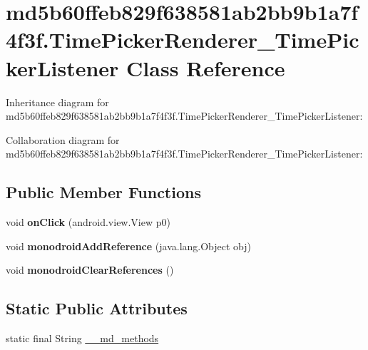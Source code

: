\hypertarget{classmd5b60ffeb829f638581ab2bb9b1a7f4f3f_1_1_time_picker_renderer___time_picker_listener}{}\section{md5b60ffeb829f638581ab2bb9b1a7f4f3f.\+Time\+Picker\+Renderer\+\_\+\+Time\+Picker\+Listener Class Reference}
\label{classmd5b60ffeb829f638581ab2bb9b1a7f4f3f_1_1_time_picker_renderer___time_picker_listener}


Inheritance diagram for md5b60ffeb829f638581ab2bb9b1a7f4f3f.\+Time\+Picker\+Renderer\+\_\+\+Time\+Picker\+Listener\+:


Collaboration diagram for md5b60ffeb829f638581ab2bb9b1a7f4f3f.\+Time\+Picker\+Renderer\+\_\+\+Time\+Picker\+Listener\+:
\subsection*{Public Member Functions}
\begin{DoxyCompactItemize}
\item 
\mbox{\label{classmd5b60ffeb829f638581ab2bb9b1a7f4f3f_1_1_time_picker_renderer___time_picker_listener_a7c0e16ecc0f7f4dfae619b6a5d54735f}} 
void {\bfseries on\+Click} (android.\+view.\+View p0)
\item 
\mbox{\label{classmd5b60ffeb829f638581ab2bb9b1a7f4f3f_1_1_time_picker_renderer___time_picker_listener_afe1bfc01f47c143b432ba0f7940fec7f}} 
void {\bfseries monodroid\+Add\+Reference} (java.\+lang.\+Object obj)
\item 
\mbox{\label{classmd5b60ffeb829f638581ab2bb9b1a7f4f3f_1_1_time_picker_renderer___time_picker_listener_af0690b3918502ce5234039a049d1a107}} 
void {\bfseries monodroid\+Clear\+References} ()
\end{DoxyCompactItemize}
\subsection*{Static Public Attributes}
\begin{DoxyCompactItemize}
\item 
static final String \hyperlink{classmd5b60ffeb829f638581ab2bb9b1a7f4f3f_1_1_time_picker_renderer___time_picker_listener_a89be3c5d1a25817d66484c33310bfee7}{\+\_\+\+\_\+md\+\_\+methods}
\end{DoxyCompactItemize}


